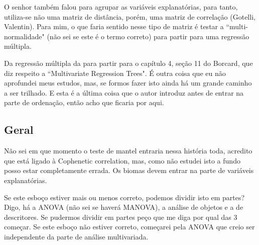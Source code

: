 \documentclass[12pt]{extarticle}
\newcommand{\asp}[1]{``#1"}
\begin{document}
O senhor também falou para agrupar as variáveis explanatórias, para tanto, utiliza-se não uma matriz de distância, porém, uma matriz de correlação (Gotelli, Valentin). Para mim, o que faria sentido nesse tipo de matriz é testar a \asp{multi-normalidade} (não sei se este é o termo correto) para partir para uma regressão múltipla. 

Da regressão múltipla da para partir para o capítulo 4, seção 11 do Borcard, que diz respeito a \asp{Multivariate Regression Trees}. É outra coisa que eu não aprofundei meus estudos, mas, se formos fazer isto ainda há um grande caminho a ser trilhado. E esta é a última coisa que o autor introduz antes de entrar na parte de ordenação, então acho que ficaria por aqui.

\subsection{Geral}

Não sei em que momento o teste de mantel entraria nessa história toda, acredito que está ligado à Cophenetic correlation, mas, como não estudei isto a fundo posso estar completamente errada. Os biomas devem entrar na parte de variáveis explanatórias.

Se este esboço estiver mais ou menos correto, podemos dividir isto em partes? Digo, há a ANOVA (não sei se haverá MANOVA), a análise de objetos e a de descritores. Se pudermos dividir em partes peço que me diga por qual das 3 começar. Se este esboço não estiver correto, começarei pela ANOVA que creio ser independente da parte de análise multivariada.



\end{document}
